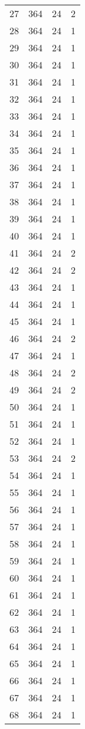 \begin{longtable}[!]{c|ccc}
	27	& 364	& 24	& 2	\\
	28	& 364	& 24	& 1	\\
	29	& 364	& 24	& 1	\\
	30	& 364	& 24	& 1	\\
	31	& 364	& 24	& 1	\\
	32	& 364	& 24	& 1	\\
	33	& 364	& 24	& 1	\\
	34	& 364	& 24	& 1	\\
	35	& 364	& 24	& 1	\\
	36	& 364	& 24	& 1	\\
	37	& 364	& 24	& 1	\\
	38	& 364	& 24	& 1	\\
	39	& 364	& 24	& 1	\\
	40	& 364	& 24	& 1	\\
	41	& 364	& 24	& 2	\\
	42	& 364	& 24	& 2	\\
	43	& 364	& 24	& 1	\\
	44	& 364	& 24	& 1	\\
	45	& 364	& 24	& 1	\\
	46	& 364	& 24	& 2	\\
	47	& 364	& 24	& 1	\\
	48	& 364	& 24	& 2	\\
	49	& 364	& 24	& 2	\\
	50	& 364	& 24	& 1	\\
	51	& 364	& 24	& 1	\\
	52	& 364	& 24	& 1	\\
	53	& 364	& 24	& 2	\\
	54	& 364	& 24	& 1	\\
	55	& 364	& 24	& 1	\\
	56	& 364	& 24	& 1	\\
	57	& 364	& 24	& 1	\\
	58	& 364	& 24	& 1	\\
	59	& 364	& 24	& 1	\\
	60	& 364	& 24	& 1	\\
	61	& 364	& 24	& 1	\\
	62	& 364	& 24	& 1	\\
	63	& 364	& 24	& 1	\\
	64	& 364	& 24	& 1	\\
	65	& 364	& 24	& 1	\\
	66	& 364	& 24	& 1	\\
	67	& 364	& 24	& 1	\\
	68	& 364	& 24	& 1	\\

\end{longtable}
